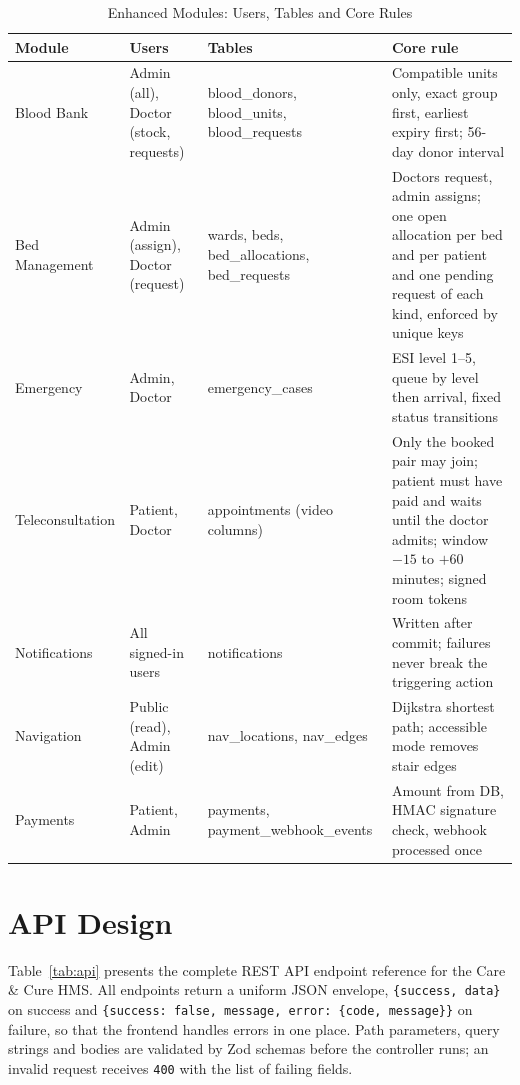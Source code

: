 \begin{table}[H]
\centering
\caption{Enhanced Modules: Users, Tables and Core Rules}
\label{tab:modules}
\renewcommand{\arraystretch}{1.25}
\begin{tabular}{|L{2.4cm}|L{2.3cm}|L{3.7cm}|L{5.0cm}|}
\hline
{}
\textbf{Module} & \textbf{Users} & \textbf{Tables} & \textbf{Core rule} \\
\hline
Blood Bank & Admin (all), Doctor (stock, requests) & blood\_donors, blood\_units, blood\_requests & Compatible units only, exact group first, earliest expiry first; 56-day donor interval \\
\hline
Bed Management & Admin (assign), Doctor (request) & wards, beds, bed\_allocations, bed\_requests & Doctors request, admin assigns; one open allocation per bed and per patient and one pending request of each kind, enforced by unique keys \\
\hline
Emergency & Admin, Doctor & emergency\_cases & ESI level 1--5, queue by level then arrival, fixed status transitions \\
\hline
Teleconsultation & Patient, Doctor & appointments (video columns) & Only the booked pair may join; patient must have paid and waits until the doctor admits; window $-15$ to $+60$ minutes; signed room tokens \\
\hline
Notifications & All signed-in users & notifications & Written after commit; failures never break the triggering action \\
\hline
Navigation & Public (read), Admin (edit) & nav\_locations, nav\_edges & Dijkstra shortest path; accessible mode removes stair edges \\
\hline
Payments & Patient, Admin & payments, payment\_webhook\_events & Amount from DB, HMAC signature check, webhook processed once \\
\hline
\end{tabular}
\end{table}

\FloatBarrier
\section{API Design}

Table~\ref{tab:api} presents the complete REST API endpoint reference for the Care \& Cure HMS. All endpoints return a uniform JSON envelope, \texttt{\{success, data\}} on success and \texttt{\{success: false, message, error: \{code, message\}\}} on failure, so that the frontend handles errors in one place. Path parameters, query strings and bodies are validated by Zod schemas before the controller runs; an invalid request receives \texttt{400} with the list of failing fields.

